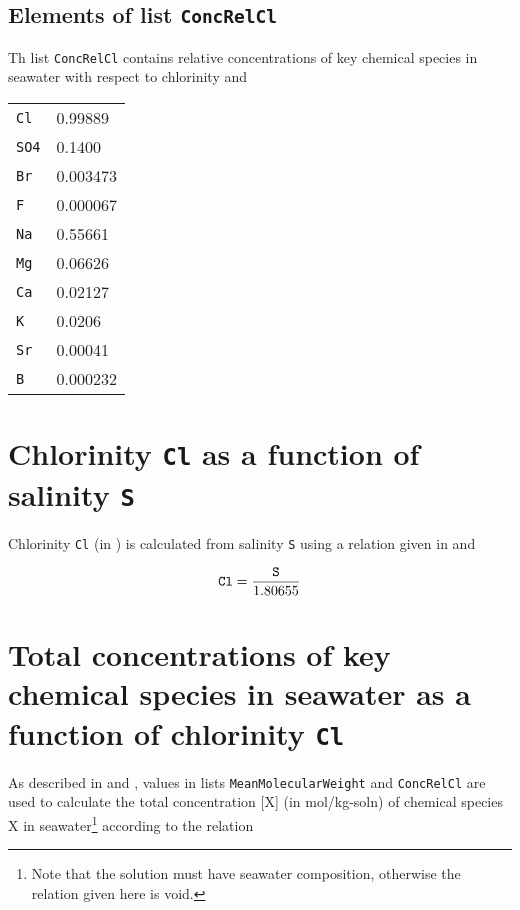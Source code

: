 \documentclass[a4paper]{article}
\begin{document}
\subsection{Elements of list \texttt{ConcRelCl}} 
Th list \texttt{ConcRelCl} contains relative concentrations of key chemical species in seawater with respect to chlorinity \citep[chap. 5, p. 11]{DOE1994} and \citep[chap. 5, p. 10]{Dickson2007}\\
\begin{center}
\begin{tabular}{|ll|} \hline
\texttt{Cl}  & 0.99889\\
\texttt{SO4} & 0.1400\\
\texttt{Br}  & 0.003473\\
\texttt{F}   & 0.000067\\
\texttt{Na}  & 0.55661\\
\texttt{Mg}  & 0.06626\\
\texttt{Ca}  & 0.02127\\
\texttt{K}   & 0.0206\\
\texttt{Sr}  & 0.00041\\
\texttt{B}   & 0.000232\\ \hline
\end{tabular}
\end{center}

\section{Chlorinity \texttt{Cl} as a function of salinity \texttt{S}}
Chlorinity \texttt{Cl} (in \textperthousand) is calculated from salinity \texttt{S} using a relation given in \citet[chap. 5, p. 11]{DOE1994} and \citet[p. 100]{Zeebe2001}

\begin{equation}
\rm \mbox{\texttt{Cl}} = \frac{\mbox{\texttt{S}}}{1.80655}
\end{equation}

\section{Total concentrations of key chemical species in seawater as a function of chlorinity \texttt{Cl}}
As described in \citet[chap. 5, p. 11]{DOE1994} and \citet[chap. 5, p. 10]{Dickson2007}, values in lists \texttt{MeanMolecularWeight} and \texttt{ConcRelCl} are used to calculate the total concentration [X] (in mol/kg-soln) of chemical species X in seawater\footnote{Note that the solution must have seawater composition, otherwise the relation given here is void.} according to the relation
\end{document}
